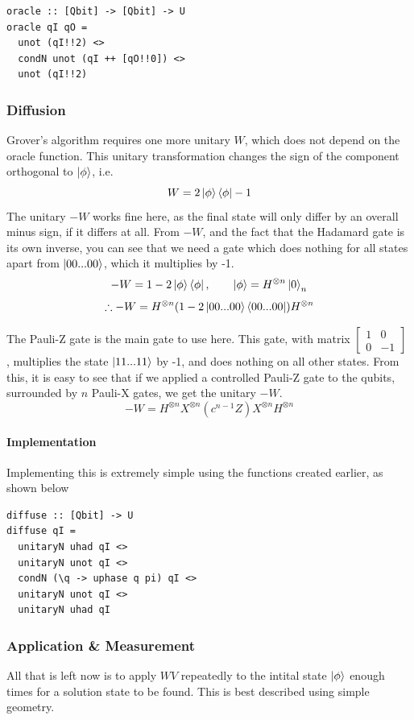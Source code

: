\documentclass[a4paper,10pt, titlepage, twoside]{article}
\begin{document}
\begin{verbatim}
oracle :: [Qbit] -> [Qbit] -> U
oracle qI qO =
  unot (qI!!2) <>
  condN unot (qI ++ [qO!!0]) <>
  unot (qI!!2)
\end{verbatim}

\subsubsection{Diffusion}
Grover's algorithm requires one more unitary $W$, which does not depend on the oracle function. This unitary transformation changes the sign of the component orthogonal to $\ket{\phi}$, i.e.
$$W = 2\ket{\phi}\bra{\phi} - 1$$
The unitary $-W$ works fine here, as the final state will only differ by an overall minus sign, if it differs at all. From $-W$, and the fact that the Hadamard gate is its own inverse, you can see that we need a gate which does nothing for all states apart from $\ket{00...00}$, which it multiplies by -1.
$$-W = 1 - 2\ket{\phi}\bra{\phi}, \qquad \ket{\phi} = H^{\otimes n}\ket{0}_n$$
$$\therefore -W = H^{\otimes n}(1 - 2\ket{00...00}\bra{00...00})H^{\otimes n}$$
\par
The Pauli-Z gate is the main gate to use here. This gate, with matrix 
$\begin{bmatrix}
	1 & 0 \\
	0 & -1
\end{bmatrix}$
, multiplies the state $\ket{11...11}$ by -1, and does nothing on all other states. From this, it is easy to see that if we applied a controlled Pauli-Z gate to the qubits, surrounded by $n$ Pauli-X gates, we get the unitary $-W$.
$$-W = H^{\otimes n} X^{\otimes n} (c^{n-1}Z) X^{\otimes n} H^{\otimes n}$$

\paragraph{Implementation} 
Implementing this is extremely simple using the functions created earlier, as shown below

\begin{verbatim}
diffuse :: [Qbit] -> U
diffuse qI =
  unitaryN uhad qI <>
  unitaryN unot qI <>
  condN (\q -> uphase q pi) qI <>
  unitaryN unot qI <>
  unitaryN uhad qI
\end{verbatim}

\subsubsection{Application \& Measurement}
All that is left now is to apply $WV$ repeatedly to the intital state $\ket{\phi}$ enough times for a solution state to be found. This is best described using simple geometry.\par
\end{document}
